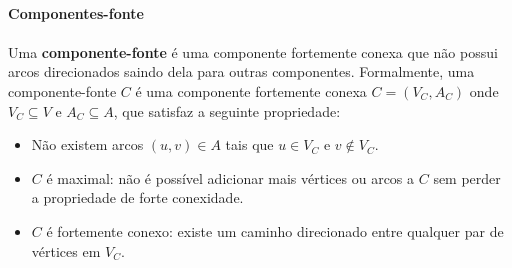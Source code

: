 \documentclass[12pt,a4paper]{article}
\begin{document}
\paragraph{Componentes-fonte}
\paragraph{}Uma \textbf{componente-fonte} é uma componente fortemente conexa que não possui arcos direcionados saindo dela para outras componentes. Formalmente, uma componente-fonte \(C\) é uma componente fortemente conexa \(C = (V_C, A_C)\) onde \(V_C \subseteq V\) e \(A_C \subseteq A\), que satisfaz a seguinte propriedade:
\begin{itemize}
    \item Não existem arcos \((u, v) \in A\) tais que \(u \in V_C\) e \(v \notin V_C\).
    \item \(C\) é maximal: não é possível adicionar mais vértices ou arcos a \(C\) sem perder a propriedade de forte conexidade.
    \item \(C\) é fortemente conexo: existe um caminho direcionado entre qualquer par de vértices em \(V_C\).
\end{itemize}
\end{document}
